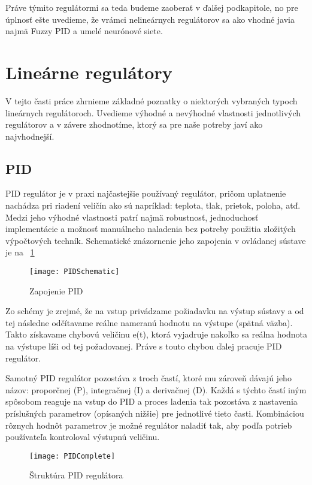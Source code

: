 Práve týmito regulátormi sa teda budeme zaoberať v ďalšej podkapitole, no pre úplnosť ešte uvedieme, že vrámci nelineárnych regulátorov sa ako vhodné javia najmä Fuzzy PID a umelé neurónové siete.

\section{Lineárne regulátory}


V tejto časti práce zhrnieme základné poznatky o niektorých vybraných typoch lineárnych regulátoroch. Uvedieme výhodné a nevýhodné vlastnosti jednotlivých regulátorov a v závere zhodnotíme, ktorý sa pre naše potreby javí ako najvhodnejší.

\subsection{PID}


PID regulátor je v praxi najčastejšie používaný regulátor, pričom uplatnenie nachádza  pri riadení veličín ako sú napríklad: teplota, tlak, prietok, poloha, atď. Medzi jeho výhodné vlastnosti patrí najmä robustnosť, jednoduchosť implementácie a možnosť manuálneho naladenia bez potreby použitia zložitých výpočtových techník.  Schematické znázornenie jeho zapojenia v ovládanej sústave je na \figurename~\ref{fig:PIDSchematic}

\begin{figure}
\centering
\texttt{[image: PIDSchematic]}
\caption{Zapojenie PID}
\label{fig:PIDSchematic}
\end{figure}

Zo schémy je zrejmé, že na vstup privádzame požiadavku na výstup sústavy a od tej následne odčítavame reálne nameranú hodnotu na výstupe (spätná väzba). Takto získavame chybovú veličinu e(t), ktorá vyjadruje nakoľko sa reálna hodnota na výstupe líši od tej požadovanej. Práve s touto chybou ďalej pracuje PID regulátor.

Samotný PID regulátor pozostáva z troch častí, ktoré mu zároveň dávajú jeho názov: proporčnej (P), integračnej (I) a derivačnej (D). Každá s týchto častí iným spôsobom reaguje na vstup do PID a proces ladenia tak pozostáva z nastavenia príslušných parametrov (opísaných nižšie) pre jednotlivé tieto časti. Kombináciou rôznych hodnôt parametrov je možné regulátor naladiť tak, aby podľa potrieb používateľa kontroloval výstupnú veličinu. 

\begin{figure}
\centering
\texttt{[image: PIDComplete]}
\caption{Štruktúra PID regulátora}
\label{fig:PIDComplete}
\end{figure}

